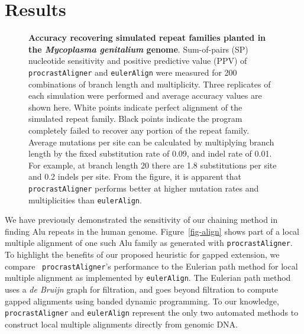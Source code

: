 \documentclass{llncs}
\begin{document}
\section{Results}
\begin{figure}[t]
\centering {}
\caption{\textbf{Accuracy recovering simulated repeat families planted in the
\textit{Mycoplasma genitalium} genome}.  Sum-of-pairs (SP) nucleotide
sensitivity and positive predictive value (PPV) of \texttt{procrastAligner}
and \texttt{eulerAlign} were measured for 200
combinations of branch length and multiplicity.  Three replicates of
each simulation were performed and average accuracy values are shown
here.  White points indicate perfect alignment of the simulated repeat
family.  Black points indicate the program completely failed to
recover any portion of the repeat family.  Average mutations per site can be
calculated by multiplying branch length by the fixed substitution rate
of 0.09, and indel rate of 0.01.  For example, at branch length 20
there are 1.8 substitutions per site and 0.2 indels per site.  From
the figure, it is apparent that \texttt{procrastAligner} performs better
at higher mutation rates and multiplicities than \texttt{eulerAlign}.}
\label{fig-results}
\end{figure}

We have previously demonstrated the sensitivity of our chaining method
in finding Alu repeats in the human
genome\cite{ref-procrast}. Figure~\ref{fig-align} shows part of a
local multiple alignment of one such Alu family as generated with
\texttt{procrastAligner}. To highlight the benefits of our proposed
heuristic for gapped extension, we compare ~\texttt{procrastAligner}'s
performance to the Eulerian path method for local multiple alignment
as implemented by \texttt{eulerAlign}\cite{ref-related1}. The Eulerian
path method uses a \textit{de Bruijn} graph for filtration, and goes
beyond filtration to compute gapped alignments using banded dynamic
programming.  To our knowledge, \texttt{procrastAligner} and
\texttt{eulerAlign} represent the only two automated methods to
construct local multiple alignments directly from genomic DNA.
\end{document}
